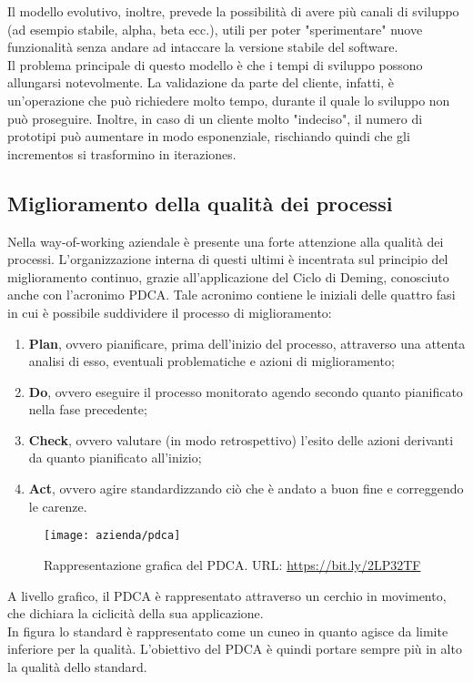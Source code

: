 Il modello evolutivo, inoltre, prevede la possibilità di avere più canali di sviluppo (ad esempio stabile, alpha, beta ecc.), utili per poter "sperimentare" nuove funzionalità senza andare ad intaccare la versione stabile del software.\\
Il problema principale di questo modello è che i tempi di sviluppo possono allungarsi notevolmente. La validazione da parte del cliente, infatti, è un'operazione che può richiedere molto tempo, durante il quale lo sviluppo non può proseguire. Inoltre, in caso di un cliente molto "indeciso", il numero di prototipi può aumentare in modo esponenziale, rischiando quindi che gli \glspl{incremento} si trasformino in \glspl{iterazione}.

\subsection{Miglioramento della qualità dei processi}
Nella way-of-working aziendale è presente una forte attenzione alla qualità dei processi. L'organizzazione interna di questi ultimi è incentrata sul principio del miglioramento continuo, grazie all'applicazione del Ciclo di Deming, conosciuto anche con l'acronimo PDCA. Tale acronimo contiene le iniziali delle quattro fasi in cui è possibile suddividere il processo di miglioramento: \begin{enumerate}
	\item \textbf{Plan}, ovvero pianificare, prima dell'inizio del processo, attraverso una attenta analisi di esso, eventuali problematiche e azioni di miglioramento;
	\item \textbf{Do}, ovvero eseguire il processo monitorato agendo secondo quanto pianificato nella fase precedente;
	\item \textbf{Check}, ovvero valutare (in modo retrospettivo) l'esito delle azioni derivanti da quanto pianificato all'inizio;
	\item \textbf{Act}, ovvero agire standardizzando ciò che è andato a buon fine e correggendo le carenze.
\end{enumerate}
\begin{figure}[!h] 
	\centering 
	\texttt{[image: azienda/pdca]} 
	\caption{Rappresentazione grafica del PDCA. URL: \url{https://bit.ly/2LP32TF} }
\end{figure}
A livello grafico, il PDCA è rappresentato attraverso un cerchio in movimento, che dichiara la ciclicità della sua applicazione.\\
In figura lo standard è rappresentato come un cuneo in quanto agisce da limite inferiore per la qualità. L'obiettivo del PDCA è quindi portare sempre più in alto la qualità dello standard.